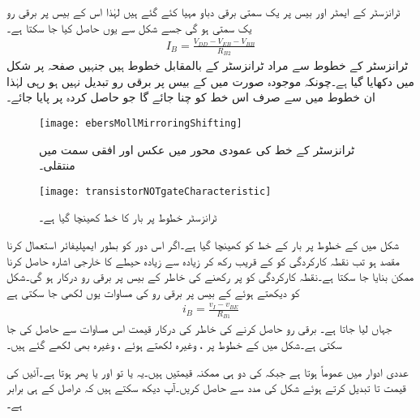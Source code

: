 ٹرانزسٹر  کے ایمٹر اور بیس پر یک سمتی برقی دباو مہیا کئے گئے ہیں لہٰذا  اس کے بیس پر برقی رو  یک سمتی ہو گی جسے شکل سے یوں حاصل کیا جا سکتا ہے۔
\begin{align*}
I_{B}=\frac{V_{DD}-V_{EB}-V_{BB}}{R_{B2}}
\end{align*}
ٹرانزسٹر  کے  خطوط سے مراد  ٹرانزسٹر  کے  بالمقابل  خطوط ہیں جنہیں صفحہ  پر شکل  میں دکھایا گیا ہے۔چونکہ موجودہ  صورت میں  کے بیس پر برقی رو تبدیل نہیں ہو رہی لہٰذا ان خطوط میں سے صرف اس خط کو چنا جائے گا جو حاصل کردہ   پر پایا جائے۔
\begin{figure}
\centering
\texttt{[image: ebersMollMirroringShifting]}
\caption{ٹرانزسٹر کے خط کی عمودی محور میں عکس اور افقی سمت میں منتقلی۔}
\label{شکل_ٹرانزسٹر_خط_عمودی_عکس_افقی_منتقلی}
\end{figure}
%
\begin{figure}
\centering
\texttt{[image: transistorNOTgateCharacteristic]}
\caption{ٹرانزسٹر خطوط پر بار کا خط کھینچا گیا ہے۔}
\label{شکل_ٹرانزسٹر_خطوط_پر_بار_کا_خط}
\end{figure}

شکل  میں  کے خطوط پر بار کے خط کو کھینچا گیا ہے۔اگر اس دور کو بطور ایمپلیفائر استعمال کرنا مقصد ہو تب نقطہ کارکردگی کو  کے قریب رکھ کر زیادہ سے زیادہ حیطے کا خارجی اشارہ حاصل کرنا ممکن بنایا جا سکتا ہے۔نقطہ کارکردگی کو  پر رکھنے کی خاطر  کے بیس پر  برقی رو درکار ہو گی۔شکل  کو دیکھتے ہوئے  کے بیس پر برقی رو کی مساوات یوں لکھی جا سکتی ہے
\begin{align*}
i_B=\frac{v_I-v_{BE}}{R_{B1}}
\end{align*}
جہاں  لیا جاتا ہے۔ برقی رو حاصل کرنے کی خاطر  کی درکار قیمت  اس مساوات سے حاصل کی جا سکتی ہے۔شکل  میں  کے خطوط  پر ،  وغیرہ لکھتے ہوئے ،  وغیرہ بھی  لکھے گئے ہیں۔

عددی ادوار میں عموماً  ہوتا ہے جبکہ  کی دو ہی ممکنہ قیمتیں ہیں۔یہ یا تو  اور  یا پھر  ہوتا ہے۔آئیں  کی قیمت  تا  تبدیل کرتے ہوئے شکل  کی مدد سے   حاصل کریں۔آپ دیکھ سکتے ہیں کہ  دراصل  کے ہی برابر ہے۔

